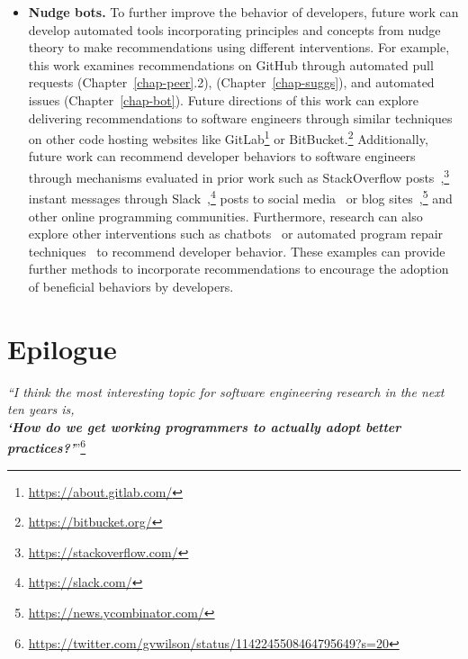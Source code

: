 \begin{itemize}
    \item \textbf{Nudge bots.} To further improve the behavior of developers, future work can develop automated tools incorporating \framework principles and concepts from nudge theory to make recommendations using different interventions. For example, this work examines recommendations on GitHub through automated pull requests (Chapter~\ref{chap-peer}.2), \sugg (Chapter~\ref{chap-suggs}), and automated issues (Chapter~\ref{chap-bot}). Future directions of this work can explore delivering recommendations to software engineers through similar techniques on other code hosting websites like GitLab\footnote{\url{https://about.gitlab.com/}} or BitBucket.\footnote{\url{https://bitbucket.org/}} Additionally, future work can recommend developer behaviors to software engineers through mechanisms evaluated in prior work such as StackOverflow posts~\cite{cai2019AnswerBot},\footnote{\url{https://stackoverflow.com/}} instant messages through Slack~\cite{lin2016slack},\footnote{\url{https://slack.com/}} posts to social media~\cite{begel2010social} or blog sites~\cite{barik2015heart},\footnote{\url{https://news.ycombinator.com/}} and other online programming communities. Furthermore, research can also explore other interventions such as chatbots~\cite{cerezo2019building} or automated program repair techniques~\cite{monperrus2019Repairnator} to recommend developer behavior. These examples can provide further methods to incorporate \framework recommendations to encourage the adoption of beneficial behaviors by developers.
\end{itemize}

\section{Epilogue}

\begin{center}
\textit{``I think the most interesting topic for software engineering research in the next ten years is, \\\textbf{`How do we get working programmers to actually adopt better practices?'}}''\footnote{\url{https://twitter.com/gvwilson/status/1142245508464795649?s=20}}
\end{center}
